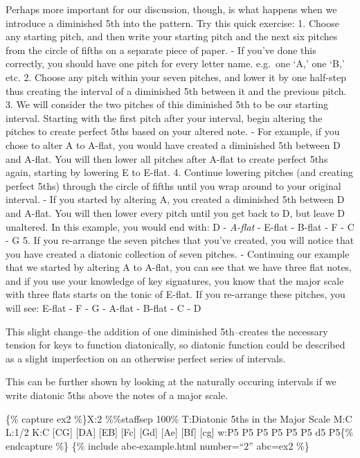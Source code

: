 \documentclass{book}
\begin{document}
Perhaps more important for our discussion, though, is what happens when we
introduce a diminished 5th into the pattern. Try this quick exercise: 1.
Choose any starting pitch, and then write your starting pitch and the next six
pitches from the circle of fifths on a separate piece of paper. - If you've
done this correctly, you should have one pitch for every letter name. e.g.~one
`A,' one `B,' etc. 2. Choose any pitch within your seven pitches, and lower it
by one half-step thus creating the interval of a diminished 5th between it and
the previous pitch. 3. We will consider the two pitches of this diminished 5th
to be our starting interval. Starting with the first pitch after your
interval, begin altering the pitches to create perfect 5ths based on your
altered note. - For example, if you chose to alter A to A-flat, you would have
created a diminished 5th between D and A-flat. You will then lower all pitches
after A-flat to create perfect 5ths again, starting by lowering E to E-flat.
4. Continue lowering pitches (and creating perfect 5ths) through the circle of
fifths until you wrap around to your original interval. - If you started by
altering A, you created a diminished 5th between D and A-flat. You will then
lower every pitch until you get back to D, but leave D unaltered. In this
example, you would end with: D - \emph{A-flat} - E-flat - B-flat - F - C - G
5. If you re-arrange the seven pitches that you've created, you will notice
that you have created a diatonic collection of seven pitches. - Continuing our
example that we started by altering A to A-flat, you can see that we have
three flat notes, and if you use your knowledge of key signatures, you know
that the major scale with three flats starts on the tonic of E-flat. If you
re-arrange these pitches, you will see: E-flat - F - G - A-flat - B-flat - C -
D

This slight change--the addition of one diminished 5th--creates the necessary
tension for keys to function diatonically, so diatonic function could be
described as a slight imperfection on an otherwise perfect series of
intervals.

This can be further shown by looking at the naturally occuring intervals if we
write diatonic 5ths above the notes of a major scale.

\{\% capture ex2 \%\}X:2 \%\%staffsep 100\% T:Diatonic 5ths in the Major Scale
M:C L:1/2 K:C {[}CG{]} {[}DA{]}\textbar{} {[}EB{]} {[}Fc{]}\textbar{} {[}Gd{]}
{[}Ae{]}\textbar{} {[}Bf{]} {[}cg{]}\textbar\textbar{} w:P5 P5 P5 P5 P5 P5 d5
P5\{\% endcapture \%\} \{\% include abc-example.html number=``2'' abc=ex2 \%\}
\end{document}
